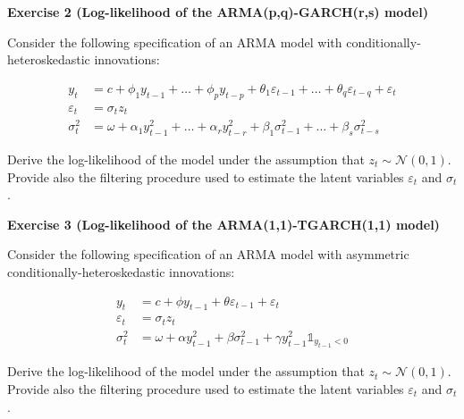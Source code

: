 \documentclass[
]{book}
\begin{document}
\textbf{Exercise 2 (Log-likelihood of the ARMA(p,q)-GARCH(r,s) model)}

Consider the following specification of an ARMA model with conditionally-heteroskedastic innovations:

\[
\begin{aligned}
y_t &= c + \phi_1 y_{t-1} + \dots + \phi_p y_{t-p} + \theta_1 \varepsilon_{t-1} + \dots + \theta_q \varepsilon_{t-q} + \varepsilon_t \\
\varepsilon_t &= \sigma_t z_t \\
\sigma^2_t &= \omega + \alpha_1 y_{t-1}^2 + \dots + \alpha_r y_{t-r}^2 + \beta_1 \sigma^2_{t-1} + \dots + \beta_s \sigma^2_{t-s}
\end{aligned}
\]

Derive the log-likelihood of the model under the assumption that \(z_t \sim \mathcal{N}(0, 1)\). Provide also the filtering procedure used to estimate the latent variables \(\varepsilon_t\) and \(\sigma_t\).

\textbf{Exercise 3 (Log-likelihood of the ARMA(1,1)-TGARCH(1,1) model)}

Consider the following specification of an ARMA model with asymmetric conditionally-heteroskedastic innovations:

\[
\begin{aligned}
y_t &= c + \phi y_{t-1} + \theta \varepsilon_{t-1} + \varepsilon_t \\
\varepsilon_t &= \sigma_t z_t \\
\sigma^2_t &= \omega + \alpha y_{t-1}^2 + \beta \sigma^2_{t-1} + \gamma y_{t-1}^2 \mathbb{1}_{y_{t-1}<0}
\end{aligned}
\]

Derive the log-likelihood of the model under the assumption that \(z_t \sim \mathcal{N}(0, 1)\). Provide also the filtering procedure used to estimate the latent variables \(\varepsilon_t\) and \(\sigma_t\).

  
\end{document}
